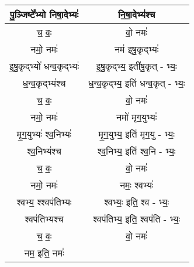 {\begin{longtable}{|c|c|}
\hline
पु॒ञ्जिष्टे᳚भ्यो निषा॒देभ्यः॑            & नि॒षा॒देभ्य॑श्च\\
\hline
च॒ वः॒                          & वो॒ नमः॑\\
\hline
नमो॒ नमः॑                       & नम॑ इषु॒कृद्भ्यः॑\\
\hline
इ॒षु॒कृद्भ्यो॑ धन्व॒कृद्भ्यः॑              & इ॒षु॒कृद्भ्य॒ इती॑षु॒कृत् - भ्यः॒\\
\hline
ध॒न्व॒कृद्भ्य॑श्च                     & ध॒न्व॒कृद्भ्य॒ इति॑ धन्व॒कृत् - भ्यः॒\\
\hline
च॒ वः॒                          & वो॒ नमः॑\\
\hline
नमो॒ नमः॑                       & नमो॑ मृग॒युभ्यः॑\\
\hline
मृ॒ग॒युभ्यः॑ श्व॒निभ्यः॑                & मृ॒ग॒युभ्य॒ इति॑ मृग॒यु - भ्यः॒\\
\hline
श्व॒निभ्य॑श्च                      & श्व॒निभ्य॒ इति॑ श्व॒नि - भ्यः॒\\
\hline
च॒ वः॒                          & वो॒ नमः॑\\
\hline
नमो॒ नमः॑                       & नमः॒ श्वभ्यः॑\\
\hline
श्वभ्य॒ श्श्वप॑तिभ्यः                & श्वभ्यः॒ इति॒ श्व - भ्यः॒\\
\hline
श्वप॑तिभ्यश्च                     & श्वप॑तिभ्य॒ इति॒ श्वप॑ति - भ्यः॒\\
\hline
च॒ वः॒                          & वो॒ नमः॑\\
\hline
नम॒ इति॒ नमः॑\\
\hline
\end{longtable}
}